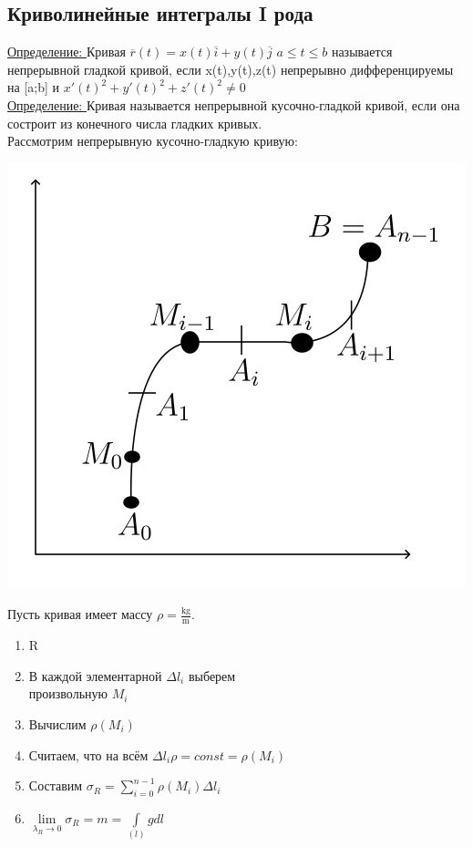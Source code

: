 \documentclass[12pt]{article}
\let\ORIincludegraphics\includegraphics
\renewcommand{\includegraphics}[2][]{\ORIincludegraphics[scale=0.65,#1]{#2}}
\let\oldint\int
\let\oldsum\sum
\let\oldlim\lim
\renewcommand{\int}{\oldint\limits}
\renewcommand{\sum}{\oldsum\limits}
\renewcommand{\lim}{\oldlim\limits}
\begin{document}
  \subsection{Криволинейные интегралы I рода}
  \underline{Определение: } Кривая $\overline{r}(t)=x(t)\overline{i}+y(t)\overline{j}$
  $a \leq t \leq b$ называется непрерывной гладкой кривой, если x(t),y(t),z(t) непрерывно дифференцируемы
  на [a;b] и $x'(t)^2+y'(t)^2+z'(t)^2 \not = 0$\\
  \underline{Определение: } Кривая называется непрерывной кусочно-гладкой кривой, если она состроит из конечного числа
  гладких кривых.\\
  Рассмотрим непрерывную кусочно-гладкую кривую:\\
  \begin{minipage}{0.45\textwidth} %
      \includegraphics[width=\linewidth]{8.1.1.png}
  \end{minipage}%
  \hspace{1em} %
  \begin{minipage}{0.65\textwidth} %
      Пусть кривая имеет массу $\rho=\frac{\mathrm{kg}}{\mathrm{m}}$.
      \begin{enumerate}
        \item R
        \item В каждой элементарной $\Delta l_i$ выберем\\ произвольную $M_i$ 
        \item Вычислим $\rho(M_i)$
        \item Считаем, что на всём $\Delta l_i \rho=const=\rho(M_i)$
        \item Составим $\sigma_R=\sum_{i=0}^{n-1}\rho(M_i)\Delta l_i$
        \item $\lim_{\lambda_R \to 0} \sigma_R = m = \int_{(l)} g dl$
      \end{enumerate}
  \end{minipage}
\end{document}
